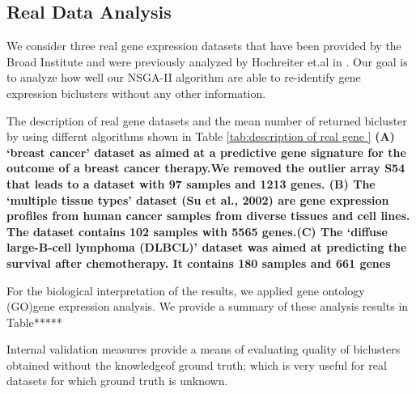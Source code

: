 \subsection{Real Data Analysis}

We consider three real gene expression datasets that have been provided
by the Broad Institute and were previously analyzed by Hochreiter et.al in \cite{hochreiter2010fabia}. Our goal is to analyze how well our NSGA-II algorithm are able to re-identify gene expression biclusters without any other information. 


The description of real gene datasets and the mean number of returned bicluster by using differnt algorithms shown in Table \ref{tab:description of real gene }
\textbf{(A) ‘breast cancer’ dataset as aimed at a predictive gene signature for the outcome of a breast cancer therapy.We removed the outlier array S54 that leads to a dataset with 97 samples and 1213 genes.
(B) The ‘multiple tissue types’ dataset (Su et al., 2002) are gene expression profiles from human cancer samples from diverse tissues and cell lines. The dataset contains 102 samples with 5565 genes.(C) The ‘diffuse large-B-cell lymphoma (DLBCL)’ dataset was aimed at predicting the survival after chemotherapy. It contains 180 samples and 661 genes}


For the biological interpretation of the results, we applied
gene ontology (GO)gene expression analysis. We
provide a summary of these analysis results in Table*****


Internal validation measures provide a means of evaluating quality of biclusters obtained without the knowledgeof  ground  truth;  which  is  very  useful  for  real  datasets  for which ground truth is unknown. 









